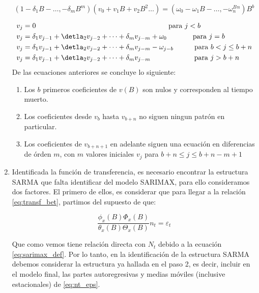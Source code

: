 \documentclass[12pt,oneside]{book}\usepackage[]{graphicx}\usepackage[]{color}
\theoremstyle{definition} %
\begin{document}
\begin{enumerate}
$$(1-\delta_1B-\dots,-\delta_mB^m) (v_0+v_1B+v_2B^2\dots)= (\omega_0-\omega_1B-\dots,-\omega_n^B^n)B^b$$

\begin{equation} 
\begin{split}
v_j & = 0  \text{ \phantom{aaaaaaaaaaaaaaaaaaaaaaaaaaaaaaaaaaaa} para } j<b\\
v_j & = \delta_1v_{j-1}+\detla_2 v_{j-2} + \dots +\delta_m v_{j-m} + \omega_0  \text{ \phantom{aaaaaa} para } j=b\\
v_j & = \delta_1v_{j-1}+\detla_2 v_{j-2} + \dots +\delta_m v_{j-m} - \omega_{j-b}  \text{ \phantom{aaaa.} para } b < j\leq b+n\\
v_j & = \delta_1v_{j-1}+\detla_2 v_{j-2} + \dots +\delta_m v_{j-m}  \text{ \phantom{aaaaaaaaaaa} para } j>b+n\\
\end{split}
\end{equation}
De las ecuaciones anteriores se concluye lo siguiente:
\begin{enumerate}
\item Los $b$ primeros coeficientes de $v(B)$ son nulos y corresponden al tiempo muerto.
\item Los coeficientes desde $v_b$ hasta $v_{b+n}$ no siguen ningun patrón en particular.
\item Los coeficientes de $v_{b+n+1}$ en adelante siguen una ecuación en diferencias de órden $m$, con $m$ valores iniciales $v_j$ para $b+n\leq j\leq b+n-m+1$

\end{enumerate}

\item Identificada la función de transferencia, es necesario encontrar la estructura SARMA que falta identificar del modelo SARIMAX, para ello consideramos dos factores. El primero de ellos, es considerar que para llegar a la relación \ref{eq:transf_bet}, partimos del supuesto de que:

\begin{equation}\label{eq:nt_eps}
 \frac{ \phi_x(B) \Phi_x(B)}{\theta_x(B) \Theta_x(B)} n_t = \varepsilon_t 
\end{equation}

Que como vemos tiene relación directa con $N_t$ debido a la ecuación \ref{eq:sarimax_def}. Por lo tanto, en la identificación de la estructura SARMA debemos considerar la estructura ya hallada en el paso 2, es decir, incluir en el modelo final, las partes autoregresivas y medias móviles (inclusive estacionales) de \ref{eq:nt_eps}.


\end{enumerate}
\end{document}
